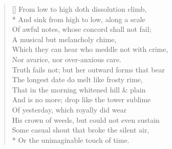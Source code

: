 \documentclass[MAIN]{subfiles}
\begin{document}
\settowidth{\versewidth}{From low to high doth dissolution climb,}
\begin{verse}[\versewidth]
From low to high doth dissolution climb,\\* 
\vin And sink from high to low, along a scale\\
\vin Of awful notes, whose concord shall not fail;\\
A musical but melancholy chime,\\
Which they can hear who meddle not with crime,\\
\vin Nor avarice, nor over-anxious care.\\
\vin Truth fails not; but her outward forms that bear\\
The longest date do melt like frosty rime,\\
That in the morning whitened hill \& plain\\
\vin And is no more; drop like the tower sublime\\
\vin \vin Of yesterday, which royally did wear\\
His crown of weeds, but could not even sustain\\
\vin \vin Some casual shout that broke the silent air,\\*
\vin Or the unimaginable touch of time.
\end{verse}
\end{document}
